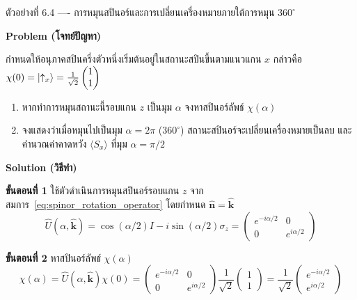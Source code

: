 \begin{psctbox}{ตัวอย่างที่ 6.4 ---- การหมุนสปินอร์และการเปลี่ยนเครื่องหมายภายใต้การหมุน $360^\circ$}

\textbf{Problem (โจทย์ปัญหา)}

กำหนดให้อนุภาคสปินครึ่งตัวหนึ่งเริ่มต้นอยู่ในสถานะสปินขึ้นตามแนวแกน $x$ กล่าวคือ $\chi(0) = \ket{\uparrow_x} = \frac{1}{\sqrt{2}}\begin{pmatrix} 1 \\ 1 \end{pmatrix}$
\begin{enumerate}
    \item หากทำการหมุนสถานะนี้รอบแกน $z$ เป็นมุม $\alpha$ จงหาสปินอร์ลัพธ์ $\chi(\alpha)$
    \item จงแสดงว่าเมื่อหมุนไปเป็นมุม $\alpha = 2\pi$ ($360^\circ$) สถานะสปินอร์จะเปลี่ยนเครื่องหมายเป็นลบ และคำนวณค่าคาดหวัง $\langle S_x \rangle$ ที่มุม $\alpha = \pi/2$
\end{enumerate}

\textbf{Solution (วิธีทำ)}

\textbf{ขั้นตอนที่ 1} ใช้ตัวดำเนินการหมุนสปินอร์รอบแกน $z$
จากสมการ~\eqref{eq:spinor_rotation_operator} โดยกำหนด $\hat{\mathbf{n}} = \hat{\mathbf{k}}$
\begin{equation*}
\hat{U}(\alpha, \hat{\mathbf{k}}) = \cos(\alpha/2) I - i \sin(\alpha/2) \sigma_z = \begin{pmatrix} e^{-i\alpha/2} & 0 \\ 0 & e^{i\alpha/2} \end{pmatrix}
\end{equation*}

\textbf{ขั้นตอนที่ 2} หาสปินอร์ลัพธ์ $\chi(\alpha)$
\begin{equation*}
\chi(\alpha) = \hat{U}(\alpha, \hat{\mathbf{k}}) \chi(0) = \begin{pmatrix} e^{-i\alpha/2} & 0 \\ 0 & e^{i\alpha/2} \end{pmatrix} \frac{1}{\sqrt{2}} \begin{pmatrix} 1 \\ 1 \end{pmatrix} = \frac{1}{\sqrt{2}} \begin{pmatrix} e^{-i\alpha/2} \\ e^{i\alpha/2} \end{pmatrix}
\end{equation*}


\end{psctbox}
